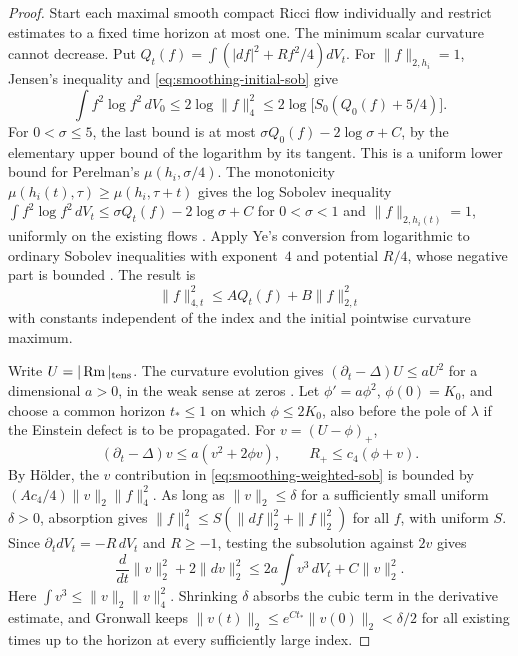 \begin{proof}
Start each maximal smooth compact Ricci flow individually and restrict
estimates to a fixed time horizon at most one. The minimum scalar
curvature cannot decrease. Put \(Q_t(f)=\int(|df|^2+Rf^2/4)dV_t\).
For \(\|f\|_{2,h_i}=1\), Jensen's inequality and
\eqref{eq:smoothing-initial-sob} give
\[
 \int f^2\log f^2\,dV_0\le 2\log\|f\|_4^2
 \le 2\log\big[S_0(Q_0(f)+5/4)\big].
\]
For \(0<\sigma\le5\), the last bound is at most
\(\sigma Q_0(f)-2\log\sigma+C\), by the elementary upper bound of
the logarithm by its tangent. This is a uniform lower bound for
Perelman's \(\mu(h_i,\sigma/4)\). The monotonicity
\(\mu(h_i(t),\tau)\ge\mu(h_i,\tau+t)\) gives the log Sobolev inequality
\(\int f^2\log f^2\,dV_t\le\sigma Q_t(f)-2\log\sigma+C\) for
\(0<\sigma<1\) and \(\|f\|_{2,h_i(t)}=1\), uniformly on the
existing flows \cite[\S3]{Perelman2002}.
Apply Ye's conversion from logarithmic to ordinary Sobolev inequalities
with exponent~\(4\) and potential \(R/4\), whose negative part is bounded
\cite[Theorem~5.5, (5.17)--(5.18)]{YeSobolevFlow}. The result is
\begin{equation}\label{eq:smoothing-weighted-sob}
 \|f\|_{4,t}^2\le A Q_t(f)+B\|f\|_{2,t}^2
\end{equation}
with constants independent of the index and the initial pointwise
curvature maximum.

Write \(U=|\operatorname{Rm}|_{\rm tens}\). The curvature evolution gives
\((\partial_t-\Delta)U\le aU^2\) for a dimensional \(a>0\), in the
weak sense at zeros \cite[Theorem~7.1]{HamiltonSingularities}. Let
\(\phi'=a\phi^2\), \(\phi(0)=K_0\), and choose a common horizon
\(t_*\le 1\) on which \(\phi\le 2K_0\), also before the pole of
\(\lambda\) if the Einstein defect is to be propagated.
For \(v=(U-\phi)_+\),
\[
 (\partial_t-\Delta)v\le a(v^2+2\phi v),\qquad
 R_+\le c_4(\phi+v).
\]
By H\"older, the \(v\) contribution in \eqref{eq:smoothing-weighted-sob}
is bounded by \((Ac_4/4)\|v\|_2\|f\|_4^2\). As long as
\(\|v\|_2\le\delta\) for a sufficiently small uniform \(\delta>0\),
absorption gives \(\|f\|_4^2\le S(\|df\|_2^2+\|f\|_2^2)\) for
all \(f\), with uniform \(S\). Since \(\partial_t dV_t=-R\,dV_t\)
and \(R\ge-1\), testing the subsolution against \(2v\) gives
\[
 \frac{d}{dt}\|v\|_2^2+2\|dv\|_2^2
 \le 2a\int v^3\,dV_t+C\|v\|_2^2.
\]
Here \(\int v^3\le\|v\|_2\|v\|_4^2\). Shrinking \(\delta\)
absorbs the cubic term in the derivative estimate, and Gronwall
keeps \(\|v(t)\|_2\le e^{Ct_*}\|v(0)\|_2<\delta/2\) for all existing
times up to the horizon at every sufficiently large index.


\end{proof}
